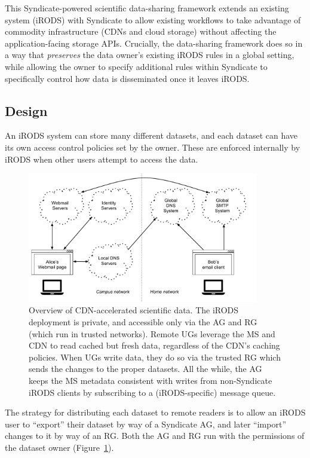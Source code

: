 This Syndicate-powered scientific data-sharing framework extends an existing system (iRODS) with
Syndicate to allow existing workflows to take advantage of commodity infrastructure
(CDNs and cloud storage) without affecting the application-facing storage APIs.
Crucially, the data-sharing framework does so in a way that \emph{preserves} the data owner's existing iRODS
rules in a global setting, while allowing the owner to specify additional
rules within Syndicate to specifically control how data is disseminated once it
leaves iRODS.

\subsection{Design}

An iRODS system can store many different datasets, and each dataset can have its
own access control policies set by the owner.  These are enforced internally by
iRODS when other users attempt to access the data.

\begin{figure}[h]
   \centering
   \includegraphics[width=0.9\textwidth,page=25]{figures/dissertation-figures}
   \caption{Overview of CDN-accelerated scientific data.  The iRODS deployment
   is private, and accessible only via the AG and RG (which run in trusted
   networks).  Remote UGs leverage the MS and CDN to read cached but fresh data,
   regardless of the CDN's caching policies.  When UGs write data, they do so
   via the trusted RG which sends the changes to the proper datasets.  All the
   while, the AG keeps the MS metadata consistent with writes from non-Syndicate
   iRODS clients by subscribing to a (iRODS-specific) message queue.}
   \label{fig:chap4-syndicate-datasets}
\end{figure}

The strategy for distributing each dataset to remote readers is to allow an
iRODS user to ``export'' their dataset by way of a Syndicate AG, and later
``import'' changes to it by way of an RG.  Both the AG and RG run with the
permissions of the dataset owner (Figure~\ref{fig:chap4-syndicate-datasets}).

